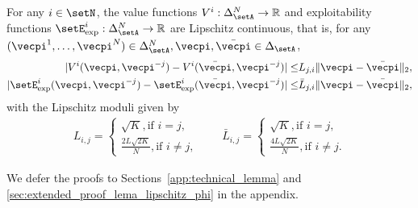 \begin{lemma}\label{lemma:phi_lipschitz}
For any $i\in \setN$, the value functions $V^i:\Delta_\setA^N \rightarrow \mathbb{R}$ and exploitability functions $\setE^i_{\text{exp}}: \Delta_\setA^N \rightarrow \mathbb{R}$ are Lipschitz continuous, that is, for any $(\vecpi^1, \ldots, \vecpi^N) \in \Delta_\setA^N, \vecpi,\bar{\vecpi} \in \Delta_\setA$,
\begin{align*}
| V^i(\vecpi, \vecpi^{-j}) - V^i(\bar{\vecpi}, \vecpi^{-j}) | \leq &L_{j,i} \| \vecpi - \bar{\vecpi}\|_2, \\
    | \setE^i_{\text{exp}}(\vecpi, \vecpi^{-j}) - \setE^i_{\text{exp}}(\bar{\vecpi}, \vecpi^{-j}) | \leq &\bar{L}_{j,i} \| \vecpi - \bar{\vecpi}\|_2,
\end{align*}
with the Lipschitz moduli given by
\begin{align*}
    L_{i,j} = \begin{cases}
\sqrt{K}, \text{if } i = j, \\
\frac{2L\sqrt{2K}}{N}, \text{if } i\neq j,
\end{cases}
\qquad 
\bar{L}_{i,j} = \begin{cases}
\sqrt{K}, \text{if } i = j, \\
\frac{4L\sqrt{2K}}{N}, \text{if } i\neq j.
\end{cases}
\end{align*}
\end{lemma}
We defer the proofs to Sections~\ref{app:technical_lemma} and \ref{sec:extended_proof_lema_lipschitz_phi} in the appendix.  



